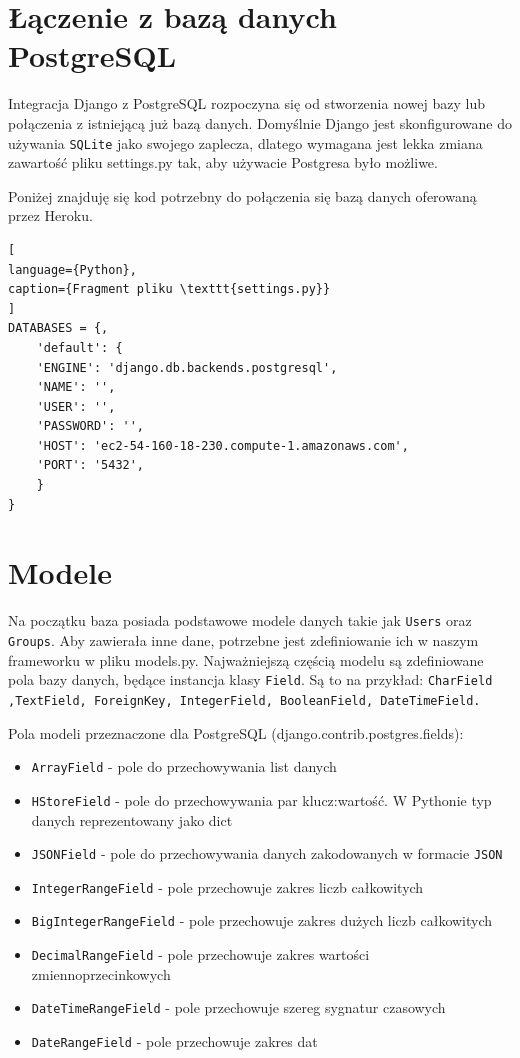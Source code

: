 \documentclass[oneside,polski,logo,indent]{amuthesis}
\begin{document}
\begin{enumerate}
\begin{enumerate}
\section{Łączenie z bazą danych PostgreSQL}
Integracja Django z PostgreSQL rozpoczyna się od stworzenia nowej bazy lub połączenia z istniejącą już bazą danych.
Domyślnie Django jest skonfigurowane do używania \texttt{SQLite} jako swojego zaplecza, dlatego wymagana jest lekka zmiana zawartość pliku settings.py tak, aby używacie Postgresa było możliwe. 

Poniżej znajduję się kod potrzebny do połączenia się bazą danych oferowaną przez Heroku. 
\begin{lstlisting}[
language={Python},
caption={Fragment pliku \texttt{settings.py}}
]
DATABASES = {,  
	'default': { 
	'ENGINE': 'django.db.backends.postgresql', 
	'NAME': '', 
	'USER': '', 
	'PASSWORD': '', 
	'HOST': 'ec2-54-160-18-230.compute-1.amazonaws.com', 
	'PORT': '5432', 
	} 
} 
\end{lstlisting}
\section{Modele}

Na początku baza posiada podstawowe modele danych takie jak  \texttt{Users} oraz \texttt{Groups}. Aby zawierała inne dane, potrzebne jest zdefiniowanie ich w naszym frameworku w pliku models.py.
Najważniejszą częścią modelu są zdefiniowane pola bazy danych, będące instancja klasy \texttt{Field}. Są to na przykład:  \texttt{CharField ,TextField, ForeignKey, IntegerField, BooleanField, DateTimeField.}

Pola modeli przeznaczone dla PostgreSQL (django.contrib.postgres.fields):
\begin{itemize}
	\item \texttt{ArrayField} - pole do przechowywania list danych
	\item \texttt{HStoreField} - pole do przechowywania par klucz:wartość. W Pythonie typ danych reprezentowany jako dict
	\item \texttt{JSONField} - pole do przechowywania danych zakodowanych w formacie \texttt{JSON}
	\item \texttt{IntegerRangeField} - pole przechowuje zakres liczb całkowitych
	\item \texttt{BigIntegerRangeField} - pole przechowuje zakres dużych liczb całkowitych
	\item \texttt{DecimalRangeField} - pole przechowuje zakres wartości zmiennoprzecinkowych
	\item \texttt{DateTimeRangeField} - pole przechowuje szereg sygnatur czasowych
	\item \texttt{DateRangeField} - pole przechowuje zakres dat
\end{itemize}


\end{enumerate}
\end{enumerate}
\end{document}
